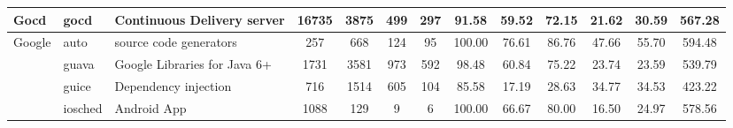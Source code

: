\begin{table*}[]
{\begin{tabular}{lll|ccc|cccc|ccc}
Gocd                        & gocd                                                          & Continuous Delivery server                                               & 16735          & 3875            & 499                                                              & 297            & 91.58          & 59.52          & 72.15          & 21.62                                                             & 30.59                                                              & 567.28                                               \\ \hline
\multirow{4}{*}{Google}     & auto                                                          & source code generators                                                   & 257            & 668             & 124                                                              & 95             & 100.00         & 76.61          & 86.76          & 47.66                                                             & 55.70                                                              & 594.48                                               \\
                            & guava                                                         & Google Libraries for Java 6+                                             & 1731           & 3581            & 973                                                              & 592            & 98.48          & 60.84          & 75.22          & 23.74                                                             & 23.59                                                              & 539.79                                               \\
                            & guice                                                         & Dependency injection                                                     & 716            & 1514            & 605                                                              & 104            & 85.58          & 17.19          & 28.63          & 34.77                                                             & 34.53                                                              & 423.22                                               \\
                            & iosched                                                       & Android App                                                              & 1088           & 129             & 9                                                                & 6              & 100.00         & 66.67          & 80.00          & 16.50                                                             & 24.97                                                              & 578.56                                               \\ \hline

\end{tabular}}
\end{table*}
